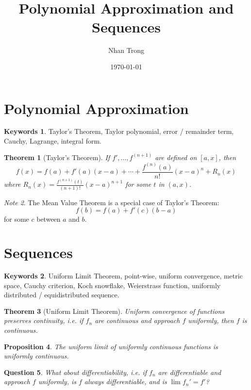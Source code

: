 \documentclass[12pt]{article}
\title{Polynomial Approximation and Sequences}
\author{Nhan Trong}
\date{\today}                                           %
\theoremstyle{plain}
\newtheorem{theorem}{Theorem}
\newtheorem{proposition}[theorem]{Proposition}
\newtheorem{question}[theorem]{Question}
\theoremstyle{definition}
\newtheorem*{keywords}{Keywords}
\theoremstyle{remark}
\newtheorem{note}[theorem]{Note}
\begin{document}
\maketitle


\part{Polynomial Approximation}

\begin{keywords}
Taylor's Theorem, Taylor polynomial, error / remainder term, Cauchy, Lagrange, integral form.
\end{keywords}

\begin{theorem}[Taylor's Theorem]
If $f', \ldots, f^{(n+1)}$ are defined on $[a, x]$, then 
$$f(x) = f(a) + f'(a)(x - a) + \cdots + \frac{f^{(n)}(a)}{n!}(x - a)^n + R_n(x)$$
where $R_n(x) = \frac{f^{(n+1)}(t)}{(n+1)!}(x - a)^{n+1}$ for some $t$ in $(a, x)$.
\end{theorem}

\begin{note}
The Mean Value Theorem is a special case of Taylor's Theorem:
$$f(b) = f(a) + f'(c)(b - a)$$
for some $c$ between $a$ and $b$.
\end{note}

\part{Sequences}

\begin{keywords}
Uniform Limit Theorem, point-wise, uniform convergence, metric space, Cauchy criterion, Koch snowflake, Weierstrass function, uniformly distributed / equidistributed sequence.
\end{keywords}

\begin{theorem}[Uniform Limit Theorem]
Uniform convergence of functions preserves continuity, i.e. if $f_n$ are continuous and approach $f$ uniformly, then $f$ is continuous.
\end{theorem}

\begin{proposition}
The uniform limit of uniformly continuous functions is uniformly continuous.
\end{proposition}

\begin{question}
What about differentiability, i.e. if $f_n$ are differentiable and approach $f$ uniformly, is $f$ always differentiable, and is $\lim f_n' = f'$? 
\end{question}
\end{document}
